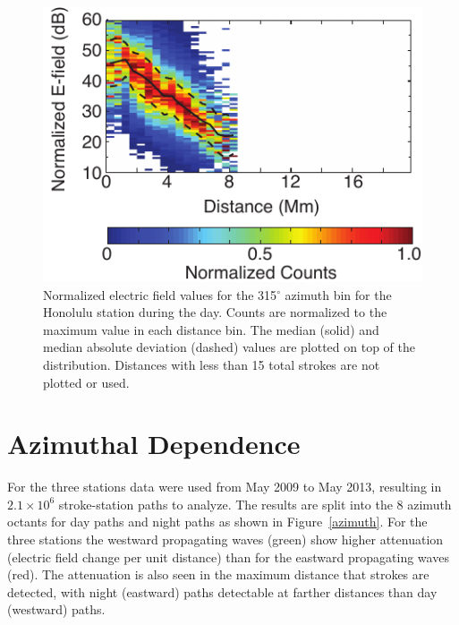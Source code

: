  \begin{figure}[h!t]
   \centering
   \includegraphics[scale=1]{Azimuth/Figures/azimuthCalculation.pdf} 
   \caption{Normalized electric field values for the 315$^\circ$ azimuth bin for the Honolulu station during the day.
   	Counts are normalized to the maximum value in each distance bin.
	The median (solid) and median absolute deviation (dashed) values are plotted on top of the distribution.
	Distances with less than 15 total strokes are not plotted or used.}
   \label{azimuthCalculation}
\end{figure}

\section{Azimuthal Dependence}

For the three stations data were used from May 2009 to May 2013, resulting in $2.1\times10^6$ stroke-station paths to analyze.
The results are split into the 8 azimuth octants for day paths and night paths as shown in Figure~\ref{azimuth}.
For the three stations the westward propagating waves (green) show higher attenuation (electric field change per unit distance) than for the eastward propagating waves (red).
The attenuation is also seen in the maximum distance that strokes are detected, with night (eastward) paths detectable at farther distances than day (westward) paths.

